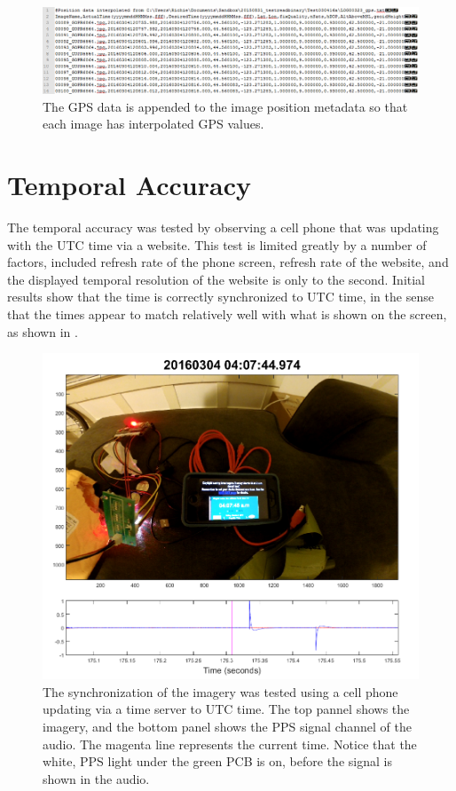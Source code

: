 	\begin{figure}[H]
		\centering
		\includegraphics[scale = 0.6]{../figures/postxt.png}
		\caption{The GPS data is appended to the image position metadata so that each image has interpolated GPS values.}
		\label{fig:postxt}
	\end{figure}
	
	\section{Temporal Accuracy}
	The temporal accuracy was tested by observing a cell phone that was updating with the UTC time via a website.  This test is limited greatly by a number of factors, included refresh rate of the phone screen, refresh rate of the website, and the displayed temporal resolution of the website is only to the second.  Initial results show that the time is correctly synchronized to UTC time, in the sense that the times appear to match relatively well with what is shown on the screen, as shown in .
	
	\begin{figure}[H]
		\centering
		\includegraphics[scale = 0.6]{../figures/badsync.png}
		\caption{The synchronization of the imagery was tested using a cell phone updating via a time server to UTC time.  The top pannel shows the imagery, and the bottom panel shows the PPS signal channel of the audio.  The magenta line represents the current time. Notice that the white, PPS light under the green PCB is on, before the signal is shown in the audio.}
		\label{fig:badsync}
	\end{figure}
	
